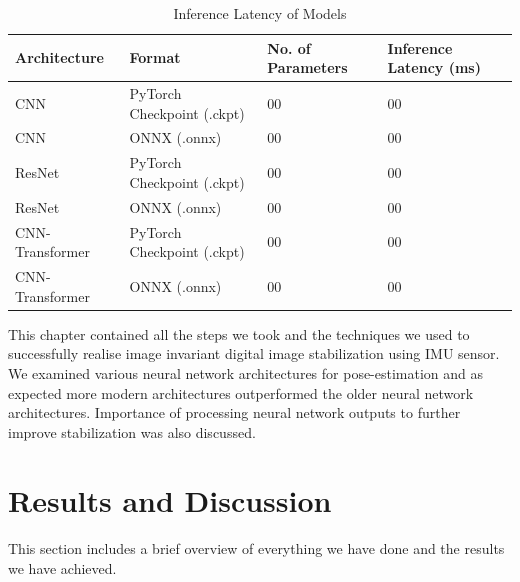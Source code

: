  \begin{table}[H]
\centering
\begin{tabular}{ l | L | L | L }
    
    Architecture  & 
    Format & 
    No. of Parameters &
    Inference Latency (ms) \\
    \hline
    
    CNN & 
    PyTorch Checkpoint (.ckpt)  & 
    00  &
    00  \\
    
    
    CNN & 
    ONNX (.onnx)  & 
    00  &
    00  \\
    
    ResNet & 
    PyTorch Checkpoint (.ckpt)  & 
    00  &
    00  \\
    
    
    ResNet & 
    ONNX (.onnx)  & 
    00  &
    00  \\
    
    CNN-Transformer & 
    PyTorch Checkpoint (.ckpt)  & 
    00  &
    00  \\
    
    
    CNN-Transformer & 
    ONNX (.onnx)  & 
    00  &
    00  \\

    \hline
   
\end{tabular}
    \caption{Inference Latency of Models}
    \label{tab:model_inference}
\end{table} %


This chapter contained all the steps we took and the techniques we used to successfully realise image invariant digital image stabilization using IMU sensor. We examined various neural network architectures for pose-estimation and as expected more modern architectures outperformed the older neural network architectures. Importance of processing neural network outputs to further improve stabilization was also discussed. 


\section{Results and Discussion}
This section includes a brief overview of everything we have done and the results we have achieved.

